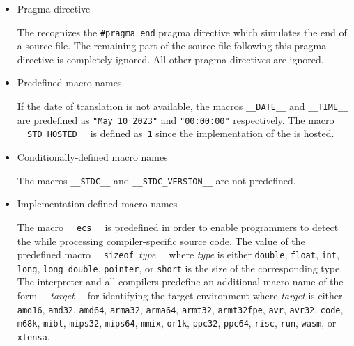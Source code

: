 \begin{itemize}
\item Pragma directive 

The \ecs{} recognizes the \texttt{\#pragma end} pragma directive which simulates the end of a source file.
The remaining part of the source file following this pragma directive is completely ignored.
All other pragma directives are ignored.

\item Predefined macro names 

If the date of translation is not available, the macros \texttt{\_\_DATE\_\_} and \texttt{\_\_TIME\_\_} are predefined as \texttt{"May 10 2023"} and \texttt{"00:00:00"} respectively.
The macro \texttt{\_\_STD\_HOSTED\_\_} is defined as~\texttt{1} since the \cpp{} implementation of the \ecs{} is hosted.

\item Conditionally-defined macro names 

The macros \texttt{\_\_STDC\_\_} and \texttt{\_\_STDC\_VERSION\_\_} are not predefined.

\item Implementation-defined macro names 

The macro \texttt{\_\_ecs\_\_} is predefined in order to enable programmers to detect the \ecs{} while processing compiler-specific source code.
The value of the predefined macro \texttt{\_\_sizeof\_}\textit{type}\texttt{\_\_} where \textit{type} is either \texttt{double}, \texttt{float}, \texttt{int}, \texttt{long}, \texttt{long_double}, \texttt{pointer}, or \texttt{short} is the size of the corresponding type.
The interpreter and all compilers predefine an additional macro name of the form \texttt{\_\_}\textit{target}\texttt{\_\_} for identifying the target environment where \textit{target} is either \texttt{amd16}, \texttt{amd32}, \texttt{amd64}, \texttt{arma32}, \texttt{arma64}, \texttt{armt32}, \texttt{armt32fpe}, \texttt{avr}, \texttt{avr32}, \texttt{code}, \texttt{m68k}, \texttt{mibl}, \texttt{mips32}, \texttt{mips64}, \texttt{mmix}, \texttt{or1k}, \texttt{ppc32}, \texttt{ppc64}, \texttt{risc}, \texttt{run}, \texttt{wasm}, or \texttt{xtensa}.

\end{itemize}


